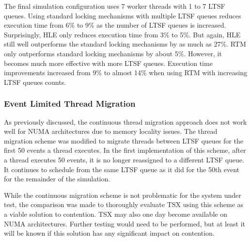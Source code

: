 \documentclass[11pt]{book}
\begin{document}
The final simulation configuration uses 7 worker threads with 1 to 7 LTSF
queues.  Using standard locking mechanisms with multiple LTSF queues reduces
execution time from 6\% to  9\% as the number of LTSF queues is increased.
Surprisingly, HLE only reduces execution time from 3\% to 5\%.  But again, HLE
still well outperforms the standard locking mechanisms by as much as 27\%.  RTM
only outperforms standard locking mechanisms by about 5\%.  However, it becomes
much more effective with more LTSF queues.  Execution time improvements
increased from 9\% to almost 14\% when using RTM with increasing LTSF queues
counts.  

%
%

\subsubsection{Event Limited Thread Migration}

As previously discussed, the continuous thread migration approach does not work well for
NUMA architectures due to memory locality issues.  The thread migration scheme was
modified to migrate threads between LTSF queues for the first 50 events a thread executes.
In the first implementation of this scheme, after a thread executes 50 events,
it is no longer reassigned to a different LTSF queue.  It continues to schedule
from the same LTSF queue as it did for the 50th event for the remainder of the
simulation. 

While the continuous migration scheme is not problematic for the system under test, the
comparison was made to thoroughly evaluate TSX using this scheme as a viable solution to
contention.  TSX may also one day become available on NUMA architectures.  Further testing
would need to be performed, but at least it will be known if this solution has any
significant impact on contention.  
\end{document}
